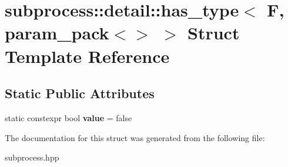 \hypertarget{structsubprocess_1_1detail_1_1has__type_3_01F_00_01param__pack_3_4_01_4}{}\section{subprocess\+:\+:detail\+:\+:has\+\_\+type$<$ F, param\+\_\+pack$<$$>$ $>$ Struct Template Reference}
\label{structsubprocess_1_1detail_1_1has__type_3_01F_00_01param__pack_3_4_01_4}
\subsection*{Static Public Attributes}
\begin{DoxyCompactItemize}
\item 
\mbox{\label{structsubprocess_1_1detail_1_1has__type_3_01F_00_01param__pack_3_4_01_4_ad25cbc9bf24cec8b19e02197046646f6}} 
static constexpr bool {\bfseries value} = false
\end{DoxyCompactItemize}


The documentation for this struct was generated from the following file\+:\begin{DoxyCompactItemize}
\item 
subprocess.\+hpp\end{DoxyCompactItemize}
